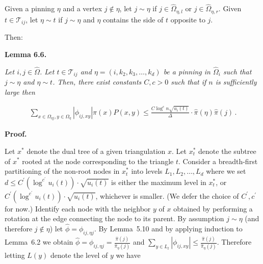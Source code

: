 \documentclass[10pt,a4paper]{article}
\begin{document}
Given a pinning $\eta$ and a vertex $j\notin\eta$, let $j\sim\eta$ if $j\in\hat{\Omega}_{\eta,l}$ or $j\in\hat{\Omega}_{\eta,r}$. Given $t\in\mathcal{T}_{ij}$, let $\eta\sim t$ if $j\sim\eta$ and $\eta$ contains the side of $t$ opposite to $j$.\par




Then:\par





\par\medskip\noindent\textbf{\textbf{Lemma 6.6}\textbf{.}}\par



\emph{Let $i,j\in\hat{\Omega}$. Let $t\in\mathcal{T}_{ij}$ and $\eta=(i,k_{2},k_{3},\dots,k_{d})$ be a pinning in $\hat{\Omega}_{i}$ such that $j\sim\eta$ and $\eta\sim t$. Then, there exist constants $C,c>0$ such that if $n$ is sufficiently large then}\par




\[\begin{gathered}
\sum_{x\in\Omega_{\eta j},y\in\Omega_{\eta}}|\phi_{ij,xy}|\pi(x)P(x,y)\leq\frac{C\log^{c}n\sqrt{u_{i}(t)}}{\Delta}\cdot\hat{\pi}(\eta)\hat{\pi}(j)\,.
\end{gathered}\]






\par\medskip\noindent\textbf{Proof.}\par



Let $x^{*}$ denote the dual tree of a given triangulation $x$. Let $x_{t}^{*}$ denote the subtree of $x^{*}$ rooted at the node corresponding to the triangle $t$. Consider a breadth-first partitioning of the non-root nodes in $x_{t}^{*}$ into levels $L_{1},L_{2},\dots,L_{d}$ where we set $d\leq C^{\prime}(\log^{c^{\prime}}u_{i}(t))\cdot\sqrt{u_{i}(t)}$ is either the maximum level in $x_{t}^{*}$, or $C^{\prime}(\log^{c^{\prime}}u_{i}(t))\cdot\sqrt{u_{i}(t)}$, whichever is smaller. (We defer the choice of $C^{\prime},c^{\prime}$ for now.) Identify each node with the neighbor $y$ of $x$ obtained by performing a rotation at the edge connecting the node to its parent. By assumption $j\sim\eta$ (and therefore $j\notin\eta$) let $\hat{\phi}=\phi_{ij,\eta j}$. By Lemma 5.10 and by applying induction to Lemma 6.2 we obtain $\hat{\phi}=\phi_{ij,\eta j}=\frac{\hat{\pi}(j)}{\hat{\pi}_{\eta}(j)}$ and $\sum_{y\in L_{t}}|\phi_{ij,xy}|\leq\frac{\hat{\pi}(j)}{\hat{\pi}_{\eta}(j)}$. Therefore letting $L(y)$ denote the level of $y$ we have\par
\end{document}
